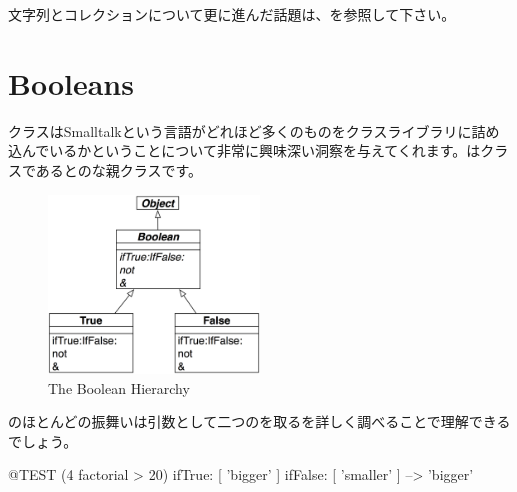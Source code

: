 \documentclass[a4paper,10pt,twoside]{book}
\begin{document}
文字列とコレクションについて更に進んだ話題は、を参照して下さい。


\section{Booleans}

クラスはSmalltalkという言語がどれほど多くのものをクラスライブラリに詰め込んでいるかということについて非常に興味深い洞察を与えてくれます。はクラスであるとのな親クラスです。

\begin{figure}[ht]
  {\centerline {\includegraphics[width=0.5\textwidth]{BooleanHierarchy}}}
\caption{The Boolean Hierarchy }
\end{figure}

のほとんどの振舞いは引数として二つのを取るを詳しく調べることで理解できるでしょう。

\begin{code}{@TEST}
(4 factorial > 20) ifTrue: [ 'bigger' ] ifFalse: [ 'smaller' ] --> 'bigger'
\end{code}
\end{document}
